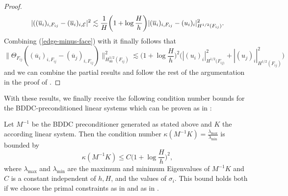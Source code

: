 \begin{proof}
    \begin{equation}
        |((\overline u_i)_{i, F_{ij}} - (\overline{u}_i)_{i, \mathcal{E}}|^2 \lesssim \frac{1}{H}\bigg(1 + \log\frac{H}{h}\bigg) |(\overline u_i)_{i, F_{ij}} - (u_i)_i|^2_{H^{1/2}(F_{ij})}.
        \label{edge-minus-face}
    \end{equation}
    Combining (\ref{edge-minus-face}) with  it finally follows that
    \[\|\Theta_{F_{ij}} ((\overline u_i)_{i, F_{ij}} - (\overline u_j)_{i, F_{ij}})\|^2_{H^{1/2}_{00}(F_{ij})} \lesssim \bigg( 1 + \log\frac{H}{h}\bigg)^2\big(|(u_i)_i|^2_{H^{1/2}(F_{ij)}} + |(u_j)_i|^2_{H^{1/2}(F_{ij})}\big)\]
    and we can combine the partial results and follow the rest of the argumentation in the proof of .
\end{proof}

With these results, we finally receive the following condition number bounds for the BDDC-preconditioned linear systems which can be proven as in \cite{dd-book}:
\begin{theorem}
    Let $M^{-1}$ be the BDDC preconditioner generated as stated above and $K$ the according linear system. Then the condition number $\kappa(M^{-1}K) = \frac{\lambda_{\max}}{\lambda_{\min}}$ is bounded by
    \[\kappa(M^{-1}K) \leq C \bigg(1 + \log\frac{H}{h}\bigg)^2,\]
    where $\lambda_{\max}$ and $\lambda_{\min}$ are the maximum and minimum Eigenvalues of $M^{-1}K$ and $C$ is a constant independent of $h, H$, and the values of $\sigma_i.$ This bound holds both if we choose the primal constraints as in  and as in .
\end{theorem}